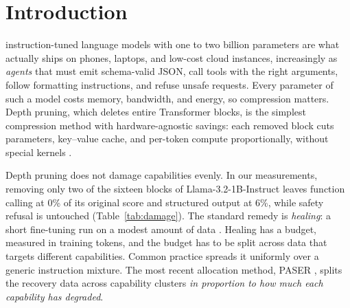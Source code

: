 \documentclass{ieeeaccess}
\begin{document}
\section{Introduction}
\label{sec:introduction}
 instruction-tuned language models with one to two billion parameters are what actually ships on phones, laptops, and low-cost cloud instances, increasingly as \emph{agents} that must emit schema-valid JSON, call tools with the right arguments, follow formatting instructions, and refuse unsafe requests. Every parameter of such a model costs memory, bandwidth, and energy, so compression matters. Depth pruning, which deletes entire Transformer blocks, is the simplest compression method with hardware-agnostic savings: each removed block cuts parameters, key--value cache, and per-token compute proportionally, without special kernels \cite{men2024shortgpt,gromov2024unreasonable,kim2024shortened,song2024sleb,muralidharan2024minitron}.

Depth pruning does not damage capabilities evenly. In our measurements, removing only two of the sixteen blocks of Llama-3.2-1B-Instruct leaves function calling at 0\% of its original score and structured output at 6\%, while safety refusal is untouched (Table~\ref{tab:damage}). The standard remedy is \emph{healing}: a short fine-tuning run on a modest amount of data \cite{gromov2024unreasonable,kim2024shortened,thangarasa2024selfdata}. Healing has a budget, measured in training tokens, and the budget has to be split across data that targets different capabilities. Common practice spreads it uniformly over a generic instruction mixture. The most recent allocation method, PASER \cite{he2026paser}, splits the recovery data across capability clusters \emph{in proportion to how much each capability has degraded}.
\end{document}
